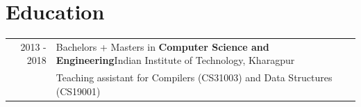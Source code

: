 \documentclass[a4paper,10pt]{extarticle} %
\begin{document}
\vspace{-2.4em}

\section{\textcolor{primary}{Education}}
\begin{tabularx}{\linewidth}{r|X}
\textsc{\hspace{0.3em}2013 - 2018} & Bachelors + Masters in \textbf{Computer Science and Engineering}\hspace{2.1em}Indian Institute of Technology, Kharagpur\hspace{0.3em}\raisebox{-.2\height}{}\\
&Teaching assistant for Compilers (CS31003) and Data Structures (CS19001)\\
\end{tabularx}


\end{document}
